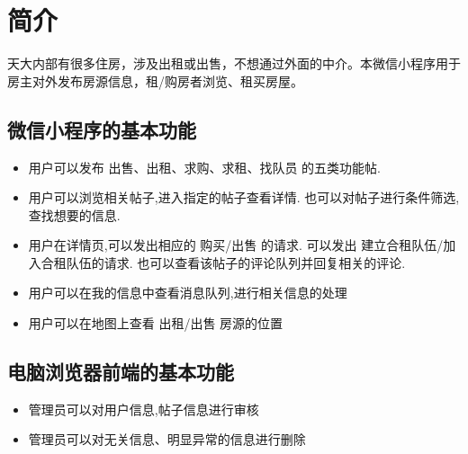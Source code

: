 
\chapter{简介}

天大内部有很多住房，涉及出租或出售，不想通过外面的中介。本微信小程序用于房主对外发布房源信息，租/购房者浏览、租买房屋。

\vspace*{15pt}

\section{微信小程序的基本功能}

\begin{itemize}
    \vspace*{5pt}
    \item 用户可以发布 出售、出租、求购、求租、找队员 的五类功能帖.
    \vspace*{5pt}
    \item 用户可以浏览相关帖子,进入指定的帖子查看详情. 也可以对帖子进行条件筛选,查找想要的信息.
    \vspace*{5pt}
    \item 用户在详情页,可以发出相应的 购买/出售 的请求. 可以发出 建立合租队伍/加入合租队伍的请求. 也可以查看该帖子的评论队列并回复相关的评论.
    \vspace*{5pt}
    \item 用户可以在我的信息中查看消息队列,进行相关信息的处理
    \vspace*{5pt}
    \item 用户可以在地图上查看 出租/出售 房源的位置

    \end{itemize}

    \vspace*{25pt}
\section{电脑浏览器前端的基本功能}

\begin{itemize}
    \vspace*{5pt}
    \item 管理员可以对用户信息,帖子信息进行审核 
    \vspace*{5pt}
    \item 管理员可以对无关信息、明显异常的信息进行删除
 
\end{itemize}
\vspace*{15pt}
